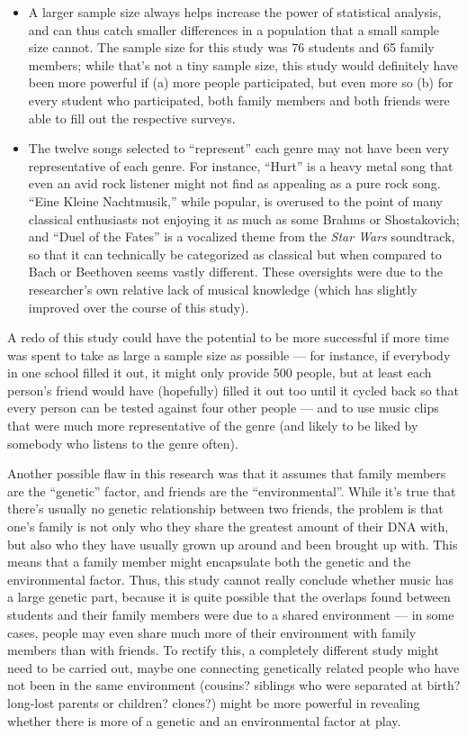 \documentclass[12pt]{report}
\begin{document}
\begin{itemize}
  \item A larger sample size always helps increase the power of statistical analysis, and can thus catch smaller differences in a population that a small sample size cannot. The sample size for this study was 76 students and 65 family members; while that's not a tiny sample size, this study would definitely have been more powerful if (a) more people participated, but even more so (b) for every student who participated, both family members and both friends were able to fill out the respective surveys.
  \item The twelve songs selected to ``represent'' each genre may not have been very representative of each genre. For instance, ``Hurt'' is a heavy metal song that even an avid rock listener might not find as appealing as a pure rock song. ``Eine Kleine Nachtmusik,'' while popular, is overused to the point of many classical enthusiasts not enjoying it as much as some Brahms or Shostakovich; and ``Duel of the Fates'' is a vocalized theme from the \textit{Star Wars} soundtrack, so that it can technically be categorized as classical but when compared to Bach or Beethoven seems vastly different. These oversights were due to the researcher's own relative lack of musical knowledge (which has slightly improved over the course of this study).
\end{itemize}

A redo of this study could have the potential to be more successful if more time was spent to take as large a sample size as possible --- for instance, if everybody in one school filled it out, it might only provide 500 people, but at least each person's friend would have (hopefully) filled it out too until it cycled back so that every person can be tested against four other people --- and to use music clips that were much more representative of the genre (and likely to be liked by somebody who listens to the genre often).

Another possible flaw in this research was that it assumes that family members are the ``genetic'' factor, and friends are the ``environmental''. While it's true that there's usually no genetic relationship between two friends, the problem is that one's family is not only who they share the greatest amount of their DNA with, but also who they have usually grown up around and been brought up with. This means that a family member might encapsulate both the genetic and the environmental factor. Thus, this study cannot really conclude whether music has a large genetic part, because it is quite possible that the overlaps found between students and their family members were due to a shared environment --- in some cases, people may even share much more of their environment with family members than with friends. To rectify this, a completely different study might need to be carried out, maybe one connecting genetically related people who have not been in the same environment (cousins? siblings who were separated at birth? long-lost parents or children? clones?) might be more powerful in revealing whether there is more of a genetic and an environmental factor at play.
\end{document}
